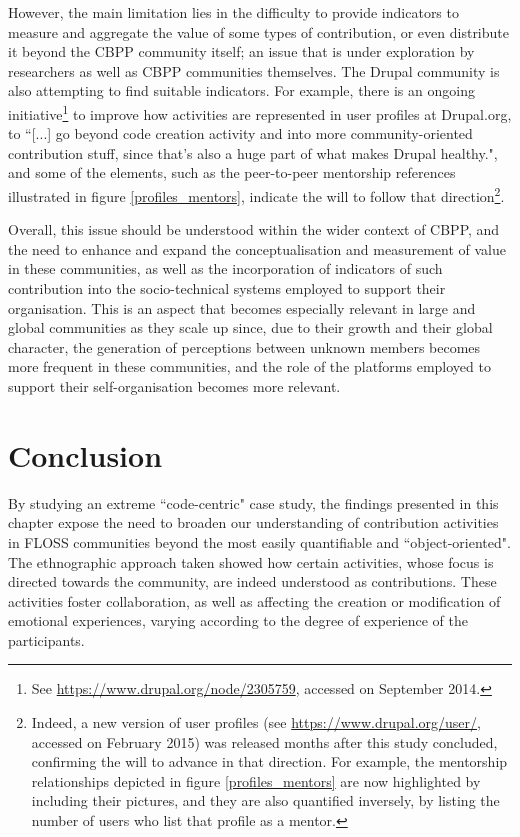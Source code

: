 However, the main limitation lies in the difficulty to provide indicators to measure and aggregate the value of some types of contribution, or even distribute it beyond the CBPP community itself; an issue that is under exploration by researchers \parencite[e.g.][]{de39measuring} as well as CBPP communities \parencite[e.g.][]{ova-value:Online} themselves. The Drupal community is also attempting to find suitable indicators. For example, there is an ongoing initiative\footnote{See \url{https://www.drupal.org/node/2305759}, accessed on  September 2014.} to improve how activities are represented in user profiles at Drupal.org, to ``[...] go beyond code creation activity and into more community-oriented contribution stuff, since that's also a huge part of what makes Drupal healthy.", and some of the elements, such as the peer-to-peer mentorship references illustrated in figure \ref{profiles_mentors}, indicate the will to follow that direction\footnote{Indeed, a new version of user profiles (see \url{https://www.drupal.org/user/}, accessed on  February 2015) was released months after this study concluded, confirming the will to advance in that direction. For example, the mentorship relationships depicted in figure \ref{profiles_mentors} are now highlighted by including their pictures, and they are also quantified inversely, by listing the number of users who list that profile as a mentor.}.

Overall, this issue should be understood within the wider context of CBPP, and the need to enhance and expand the conceptualisation and measurement of value in these communities, as well as the incorporation of indicators of such contribution into the socio-technical systems employed to support their organisation. This is an aspect that becomes especially relevant in large and global communities as they scale up since, due to their growth and their global character, the generation of perceptions between unknown members becomes more frequent in these communities, and the role of the platforms employed to support their self-organisation becomes more relevant.

\section{Conclusion}

By studying an extreme ``code-centric" case study, the findings presented in this chapter expose the need to broaden our understanding of contribution activities in FLOSS communities beyond the most easily quantifiable and ``object-oriented". The ethnographic approach taken showed how certain activities, whose focus is directed towards the community, are indeed understood as contributions. These activities foster collaboration, as well as affecting the creation or modification of emotional experiences, varying according to the degree of experience of the participants.

